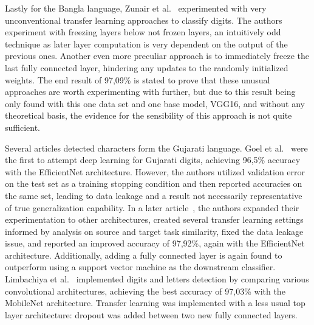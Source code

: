 \documentclass[english,twoside,openright]{UH_DS_MSc}
\begin{document}
Lastly for the Bangla language, Zunair et al.~\cite{11zunairUnconventionalWisdom} experimented 
with very unconventional transfer learning approaches to classify digits.
The authors experiment with freezing layers below not frozen layers, an intuitively odd 
technique as later layer computation is very dependent on the output of the previous ones.
Another even more preculiar approach is to immediately freeze the last fully connected layer, 
hindering any updates to the randomly initialized weights. The end result of 97,09\% is stated 
to prove that these unusual approaches are worth experimenting with further, but due to this 
result being only found with this one data set and one base model, VGG16, and without any 
theoretical basis, the evidence for the sensibility of this approach is not quite sufficient.



Several articles detected characters form the Gujarati language.
Goel et al.~\cite{10goelGujarati} were the first to attempt deep learning for Gujarati digits, 
achieving 96,5\% accuracy with the EfficientNet architecture. However, the authors utilized 
validation error on the test set as a training stopping condition and then reported accuracies 
on the same set, leading to data leakage and a result not necessarily representative of true
generalization capability. In a later article~\cite{8goelGujarati2023}, the authors expanded 
their experimentation to other architectures, created several transfer learning settings informed 
by analysis on source and target task similarity, fixed the data leakage issue, and reported an 
improved accuracy of 97,92\%, again with the EfficientNet architecture. Additionally, adding a fully
connected layer is again found to outperform using a support vector machine as the downstream classifier.
Limbachiya et al.~\cite{2limbachiyaGujarati} implemented digits and letters detection by comparing various convolutional architectures,
 achieving the best accuracy of 97,03\% with the MobileNet architecture. Transfer learning was implemented with a
  less usual top layer architecture: dropout was added between two new fully connected layers.
\end{document}
